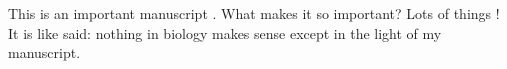 \documentclass[11pt]{article}
\begin{document}
This is an important manuscript \citep{stebbins1957}. What makes it so important? Lots of things \citep[e.g.,][]{bruneau1988, kenrick1989}! It is like \citet{dobzhansky1973} said: nothing in biology makes sense except in the light of my manuscript.


 
\end{document}
